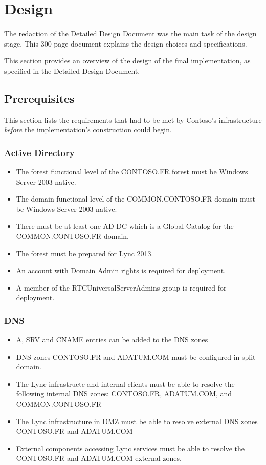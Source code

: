 \section{Design}
\paragraph{}
The redaction of the Detailed Design Document was the main task of the design stage. This 300-page document explains the design choices and specifications.

This section provides an overview of the design of the final implementation, as specified in the Detailed Design Document.

\subsection{Prerequisites}
This section lists the requirements that had to be met by Contoso's infrastructure \textit{before} the implementation's construction could begin.

	\subsubsection{Active Directory}
		\begin{itemize}
			\item The forest functional level of the CONTOSO.FR forest must be Windows Server 2003 native.
			\item The domain functional level of the COMMON.CONTOSO.FR domain must be Windows Server 2003 native.
			\item There must be at least one AD DC which is a Global Catalog for the COMMON.CONTOSO.FR domain.
			\item The forest must be prepared for Lync 2013.
			\item An account with Domain Admin rights is required for deployment.
			\item A member of the RTCUniversalServerAdmins group is required for deployment.
		\end{itemize}
		
	\subsubsection{DNS}
		\begin{itemize}
			\item A, SRV and CNAME entries can be added to the DNS zones
			\item DNS zones CONTOSO.FR and ADATUM.COM must be configured in split-domain.
			\item The Lync infrastructe and internal clients must be able to resolve the following internal DNS zones: CONTOSO.FR, ADATUM.COM, and COMMON.CONTOSO.FR
			\item The Lync infrastructure in DMZ must be able to resolve external DNS zones CONTOSO.FR and ADATUM.COM
			\item External components accessing Lync services must be able to resolve the CONTOSO.FR and ADATUM.COM external zones.
		\end{itemize}
		
